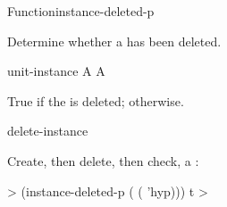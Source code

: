 \documentclass[10pt,twoside,english,pdftex]{article}
\begin{document}
\begin{functiondoc}{Function}{instance-deleted-p}{
    \returns{} }

\fnsyntax

\fnpurpose Determine whether a  has been deleted. 

\fnpackage {}

\fnmodule {}

\fnargs
\begin{args}{unit-instance}
 A 
\arg[boolean] A 
\end{args}

\fnreturns True if the  is deleted; \nil{} otherwise.

\begin{alsos}{delete-instance}
\end{alsos}

\fnexample
{}%
%
Create, then delete, then check, a  :
%
\W\supp
\begin{example}
  > (instance-deleted-p ( ( 'hyp)))
  t
  >
\end{example}

\end{functiondoc}

\end{document}
